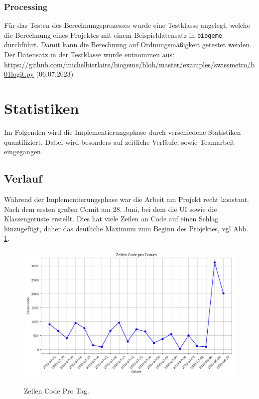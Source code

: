 \documentclass{article}
\begin{document}
\subsubsection{Processing}
Für das Testen des Berechnungsprozesses wurde eine Testklasse angelegt, welche die Berechnung eines Projektes mit einem Beispieldatensatz in \texttt{biogeme} durchführt. Damit kann die Berechnung auf Ordnungsmäßigkeit getestet werden.\\
Der Datensatz in der Testklasse wurde entnommen aus:\\ \url{https://github.com/michelbierlaire/biogeme/blob/master/examples/swissmetro/b01logit.py} (06.07.2023) \\


\newpage
\section{Statistiken}

Im Folgenden wird die Implementierungsphase durch verschiedene Statistiken quantifiziert. Dabei wird besonders auf zeitliche Verläufe, sowie Teamarbeit eingegangen.

\subsection{Verlauf}

Während der Implementierungsphase war die Arbeit am Projekt recht konstant. Nach dem ersten großen Comit am 28. Juni, bei dem die UI sowie die Klassengerüste erstellt. Dies hat viele Zeilen an Code auf einen Schlag hinzugefügt, daher das deutliche Maximum zum Beginn des Projektes, vgl Abb. \ref{fig:code_per_day}.

\begin{figure}[H]%
    \centering
    \includegraphics[width=12cm]{docs/implementation/report/img/CodeProTag.png}
    \label{fig:code_per_day}
    \caption{Zeilen Code Pro Tag.}
\end{figure}
\end{document}
